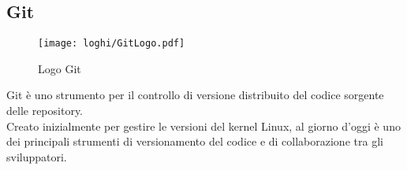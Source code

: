 \subsection*{Git}
\begin{figure}[!h] 
    \centering 
    \texttt{[image: loghi/GitLogo.pdf]}
    \caption{Logo Git}
\end{figure}
\noindent Git è uno strumento per il controllo di versione distribuito del codice sorgente delle repository.\\
Creato inizialmente per gestire le versioni del kernel Linux, al giorno d'oggi è uno dei principali
strumenti di versionamento del codice e di collaborazione tra gli sviluppatori.
